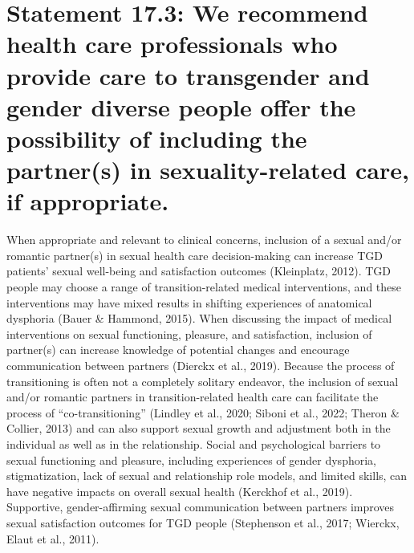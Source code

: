 \documentclass[
]{book}
\begin{document}
\hypertarget{statement-17.3-we-recommend-health-care-professionals-who-provide-care-to-transgender-and-gender-diverse-people-offer-the-possibility-of-including-the-partners-in-sexuality-related-care-if-appropriate.}{%
\section*{Statement 17.3: We recommend health care professionals who provide care to transgender and gender diverse people offer the possibility of including the partner(s) in sexuality-related care, if appropriate.}\label{statement-17.3-we-recommend-health-care-professionals-who-provide-care-to-transgender-and-gender-diverse-people-offer-the-possibility-of-including-the-partners-in-sexuality-related-care-if-appropriate.}}

When appropriate and relevant to clinical concerns, inclusion of a sexual and/or romantic partner(s) in sexual health care decision-making can
increase TGD patients' sexual well-being and
satisfaction outcomes (Kleinplatz, 2012). TGD
people may choose a range of transition-related
medical interventions, and these interventions
may have mixed results in shifting experiences
of anatomical dysphoria (Bauer \& Hammond,
2015). When discussing the impact of medical
interventions on sexual functioning, pleasure, and
satisfaction, inclusion of partner(s) can increase
knowledge of potential changes and encourage
communication between partners (Dierckx et al.,
2019). Because the process of transitioning is
often not a completely solitary endeavor, the
inclusion of sexual and/or romantic partners in
transition-related health care can facilitate the
process of ``co-transitioning'' (Lindley et al., 2020;
Siboni et al., 2022; Theron \& Collier, 2013) and
can also support sexual growth and adjustment
both in the individual as well as in the relationship. Social and psychological barriers to sexual
functioning and pleasure, including experiences
of gender dysphoria, stigmatization, lack of sexual
and relationship role models, and limited skills,
can have negative impacts on overall sexual
health (Kerckhof et al., 2019). Supportive,
gender-affirming sexual communication between
partners improves sexual satisfaction outcomes
for TGD people (Stephenson et al., 2017; Wierckx,
Elaut et al., 2011).
\end{document}
